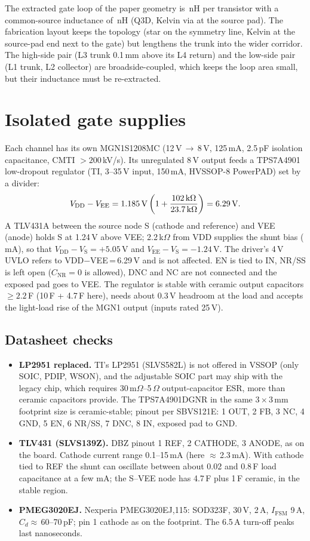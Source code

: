 \documentclass[10pt,a4paper]{article}
\begin{document}
The extracted gate loop of the paper geometry is \LgateCs\,nH per transistor with a common-source inductance of \LcsKel\,nH (Q3D, Kelvin via at the source pad). The fabrication layout keeps the topology (star on the symmetry line, Kelvin at the source-pad end next to the gate) but lengthens the trunk into the wider corridor. The high-side pair (L3 trunk 0.1\,mm above its L4 return) and the low-side pair (L1 trunk, L2 collector) are broadside-coupled, which keeps the loop area small, but their inductance must be re-extracted.

\section{Isolated gate supplies}
Each channel has its own MGN1S1208MC (12\,V\,$\rightarrow$\,8\,V, 125\,mA, 2.5\,pF isolation capacitance, CMTI $>200$\,kV/\textmu s). Its unregulated 8\,V output feeds a TPS7A4901 low-dropout regulator (TI, 3--35\,V input, 150\,mA, HVSSOP-8 PowerPAD) set by a divider:
\[
V_\mathrm{DD}-V_\mathrm{EE}=1.185\,\mathrm{V}\left(1+\frac{102\,\mathrm{k}\Omega}{23.7\,\mathrm{k}\Omega}\right)=6.29\,\mathrm{V}.
\]
A TLV431A between the source node S (cathode and reference) and VEE (anode) holds S at 1.24\,V above VEE; 2.2\,k$\Omega$ from VDD supplies the shunt bias (\Ish\,mA), so that $V_\mathrm{DD}-V_\mathrm{S}=+5.05$\,V and $V_\mathrm{EE}-V_\mathrm{S}=-1.24$\,V. The driver's 4\,V UVLO refers to VDD$-$VEE\,=\,6.29\,V and is not affected. EN is tied to IN, NR/SS is left open ($C_\mathrm{NR}=0$ is allowed), DNC and NC are not connected and the exposed pad goes to VEE. The regulator is stable with ceramic output capacitors $\geq 2.2$\,\textmu F (10\,\textmu F + 4.7\,\textmu F here), needs about 0.3\,V headroom at the load and accepts the light-load rise of the MGN1 output (inputs rated 25\,V).

\subsection{Datasheet checks}\label{sec:dscheck}
\begin{itemize}
\item \textbf{LP2951 replaced.} TI's LP2951 (SLVS582L) is not offered in VSSOP (only SOIC, PDIP, WSON), and the adjustable SOIC part may ship with the legacy chip, which requires 30\,m$\Omega$--5\,$\Omega$ output-capacitor ESR, more than ceramic capacitors provide. The TPS7A4901DGNR in the same 3\,$\times$\,3\,mm footprint size is ceramic-stable; pinout per SBVS121E: 1 OUT, 2 FB, 3 NC, 4 GND, 5 EN, 6 NR/SS, 7 DNC, 8 IN, exposed pad to GND.
\item \textbf{TLV431 (SLVS139Z).} DBZ pinout 1 REF, 2 CATHODE, 3 ANODE, as on the board. Cathode current range 0.1--15\,mA (here $\approx$\,2.3\,mA). With cathode tied to REF the shunt can oscillate between about 0.02 and 0.8\,\textmu F load capacitance at a few mA; the S--VEE node has 4.7\,\textmu F plus 1\,\textmu F ceramic, in the stable region.
\item \textbf{PMEG3020EJ.} Nexperia PMEG3020EJ,115: SOD323F, 30\,V, 2\,A, $I_\mathrm{FSM}$ 9\,A, $C_d\approx$\,60--70\,pF; pin 1 cathode as on the footprint. The 6.5\,A turn-off peaks last nanoseconds.
\end{itemize}
\end{document}
